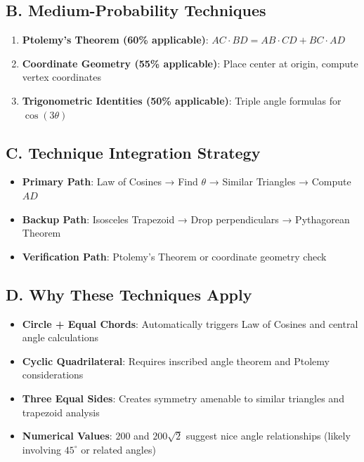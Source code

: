 \documentclass[12pt]{article}
\begin{document}
\begin{conversionbox}
\subsection*{B. Medium-Probability Techniques}
\begin{enumerate}[leftmargin=*, start=5]
    \item \textbf{Ptolemy's Theorem (60\% applicable)}: $AC \cdot BD = AB \cdot CD + BC \cdot AD$
    \item \textbf{Coordinate Geometry (55\% applicable)}: Place center at origin, compute vertex coordinates
    \item \textbf{Trigonometric Identities (50\% applicable)}: Triple angle formulas for $\cos(3\theta)$
\end{enumerate}

\subsection*{C. Technique Integration Strategy}
\begin{itemize}[leftmargin=*]
    \item \textbf{Primary Path}: Law of Cosines → Find $\theta$ → Similar Triangles → Compute $AD$
    \item \textbf{Backup Path}: Isosceles Trapezoid → Drop perpendiculars → Pythagorean Theorem
    \item \textbf{Verification Path}: Ptolemy's Theorem or coordinate geometry check
\end{itemize}

\subsection*{D. Why These Techniques Apply}
\begin{itemize}[leftmargin=*]
    \item \textbf{Circle + Equal Chords}: Automatically triggers Law of Cosines and central angle calculations
    \item \textbf{Cyclic Quadrilateral}: Requires inscribed angle theorem and Ptolemy considerations
    \item \textbf{Three Equal Sides}: Creates symmetry amenable to similar triangles and trapezoid analysis
    \item \textbf{Numerical Values}: $200$ and $200\sqrt{2}$ suggest nice angle relationships (likely involving $45^\circ$ or related angles)
\end{itemize}
\end{conversionbox}
\end{document}
